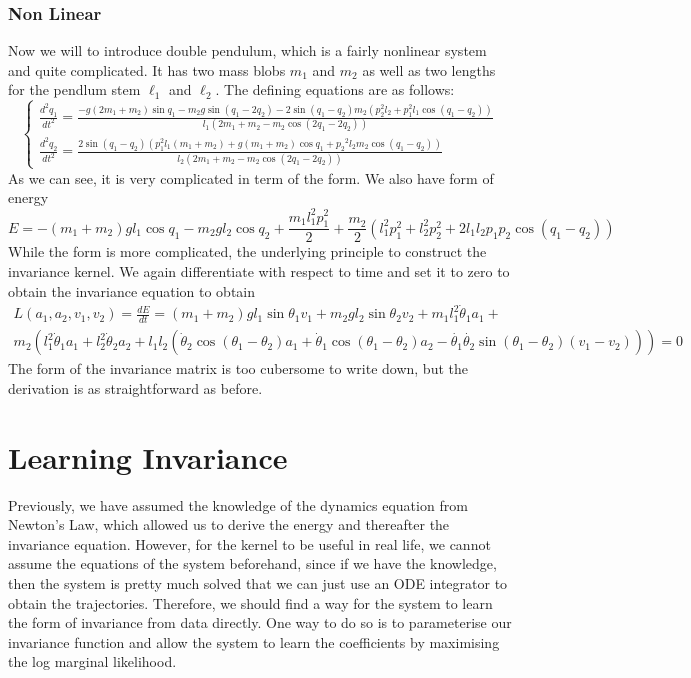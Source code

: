 \documentclass{statsmsc}
\begin{document}
\subsection{Non Linear}
Now we will to introduce double pendulum, which is a fairly nonlinear system and quite complicated. 
It has two mass blobs $m_1$ and $m_2$ as well as two lengths for the pendlum stem $\ell_1$ and $\ell_2$.
The defining equations are as follows:
$$
\begin{cases}
\frac{d^2q_1}{dt^2}=\frac{-g\left(2 m_{1}+m_{2}\right) \sin q_1-m_{2} g \sin \left(q_1-2 q_2\right)-2 \sin \left(q_1-q_2\right) m_{2}\left(p_2^{2} l_{2}+p_1^{2} l_{1} \cos \left(q_1-q_2\right)\right)}{l_{1}\left(2 m_{1}+m_{2}-m_{2} \cos \left(2 q_1-2 q_2\right)\right)} \\
\frac{d^2q_2}{dt^2}=\frac{2 \sin \left(q_1-q_2\right)\left(p_1^{2} l_{1}\left(m_{1}+m_{2}\right)+g\left(m_{1}+m_{2}\right) \cos q_1+p_2{ }^{2} l_{2} m_{2} \cos \left(q_1-q_2\right)\right)}{l_{2}\left(2 m_{1}+m_{2}-m_{2} \cos \left(2 q_1-2 q_2\right)\right)}
\end{cases}
$$
As we can see, it is very complicated in term of the form.
We also have form of energy 
$$
E = -(m_1+m_2)gl_1\cos q_1-m_2gl_2\cos q_2+ \frac{m_1l^2_1p_1^2}{2}+\frac{m_2}{2}(l^2_1p_1^2+l^2_2p_2^2+2l_1l_2p_1p_2\cos(q_1-q_2))
$$
While the form is more complicated, the underlying principle to construct the invariance kernel. 
We again differentiate with respect to time and set it to zero to obtain the invariance equation to obtain 
\begin{gather*}
L(a_1, a_2, v_1, v_2)=\frac{dE}{dt} = (m_1+m_2)gl_1\sin\theta_1v_1+m_2gl_2\sin\theta_2v_2+m_1l_1^2\dot{\theta}_1a_1+\\m_2(l_1^2\dot{\theta}_1a_1+l_2^2\dot{\theta}_2a_2+l_1l_2(\dot{\theta}_2\cos(\theta_1-\theta_2)a_1+\dot{\theta}_1\cos(\theta_1-\theta_2)a_2-\dot{\theta_1}\dot{\theta_2}\sin(\theta_1-\theta_2)(v_1-v_2)))=0
\end{gather*}
The form of the invariance matrix is too cubersome to write down, but the derivation is as straightforward as before. 



\chapter{Learning Invariance}
Previously, we have assumed the knowledge of the dynamics equation from Newton's Law, which allowed us to derive the energy and thereafter the invariance equation. 
However, for the kernel to be useful in real life, we cannot assume the equations of the system beforehand, since if we have the knowledge, then the system is pretty much solved that we can just use an ODE integrator to obtain the trajectories. 
Therefore, we should find a way for the system to learn the form of invariance from data directly.
One way to do so is to parameterise our invariance function and allow the system to learn the coefficients by maximising the log marginal likelihood.
\end{document}
